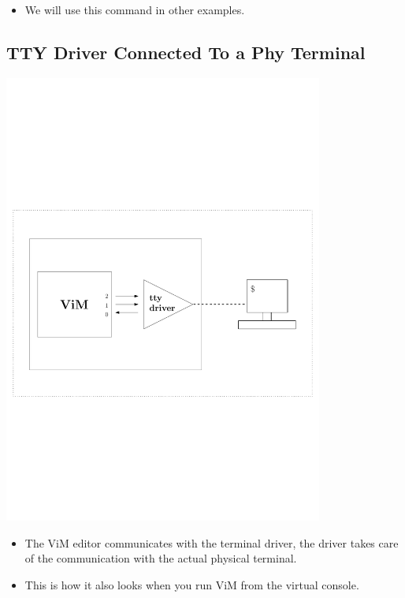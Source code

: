 \begin{itemize}
\item We will use this command in other examples.
\end{itemize}


\subsection{TTY Driver Connected To a Phy Terminal}

\begin{center}
\includegraphics[width=105mm]{img/terminals/working-with-phy-term.pdf}
\end{center}

\begin{itemize}
\item The ViM editor communicates with the terminal driver, the driver takes
care of the communication with the actual physical terminal.
\item This is how it also looks when you run ViM from the virtual console.
\end{itemize}

